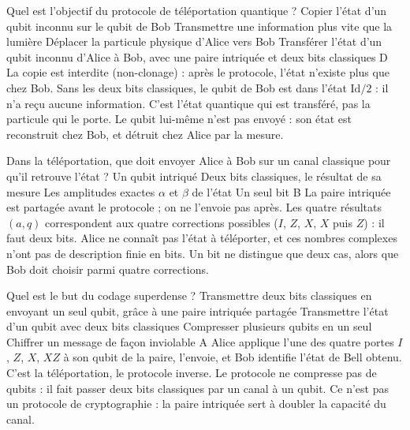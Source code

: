   {Quel est l'objectif du protocole de téléportation quantique ?}
  {Copier l'état d'un qubit inconnu sur le qubit de Bob}
  {Transmettre une information plus vite que la lumière}
  {Déplacer la particule physique d'Alice vers Bob}
  {Transférer l'état d'un qubit inconnu d'Alice à Bob, avec une paire intriquée et deux bits classiques}
  {D}
\qcmx
  {La copie est interdite (non-clonage) : après le protocole, l'état n'existe plus que chez Bob.}
  {Sans les deux bits classiques, le qubit de Bob est dans l'état $\mathrm{Id}/2$ : il n'a reçu aucune information.}
  {C'est l'état quantique qui est transféré, pas la particule qui le porte.}
  {Le qubit lui-même n'est pas envoyé : son état est reconstruit chez Bob, et détruit chez Alice par la mesure.}

  {Dans la téléportation, que doit envoyer Alice à Bob sur un canal classique pour qu'il retrouve l'état ?}
  {Un qubit intriqué}
  {Deux bits classiques, le résultat de sa mesure}
  {Les amplitudes exactes $\alpha$ et $\beta$ de l'état}
  {Un seul bit}
  {B}
\qcmx
  {La paire intriquée est partagée avant le protocole ; on ne l'envoie pas après.}
  {Les quatre résultats $(a,q)$ correspondent aux quatre corrections possibles ($I$, $Z$, $X$, $X$ puis $Z$) : il faut deux bits.}
  {Alice ne connaît pas l'état à téléporter, et ces nombres complexes n'ont pas de description finie en bits.}
  {Un bit ne distingue que deux cas, alors que Bob doit choisir parmi quatre corrections.}

  {Quel est le but du codage superdense ?}
  {Transmettre deux bits classiques en envoyant un seul qubit, grâce à une paire intriquée partagée}
  {Transmettre l'état d'un qubit avec deux bits classiques}
  {Compresser plusieurs qubits en un seul}
  {Chiffrer un message de façon inviolable}
  {A}
\qcmx
  {Alice applique l'une des quatre portes $I$, $Z$, $X$, $XZ$ à son qubit de la paire, l'envoie, et Bob identifie l'état de Bell obtenu.}
  {C'est la téléportation, le protocole inverse.}
  {Le protocole ne compresse pas de qubits : il fait passer deux bits classiques par un canal à un qubit.}
  {Ce n'est pas un protocole de cryptographie : la paire intriquée sert à doubler la capacité du canal.}

